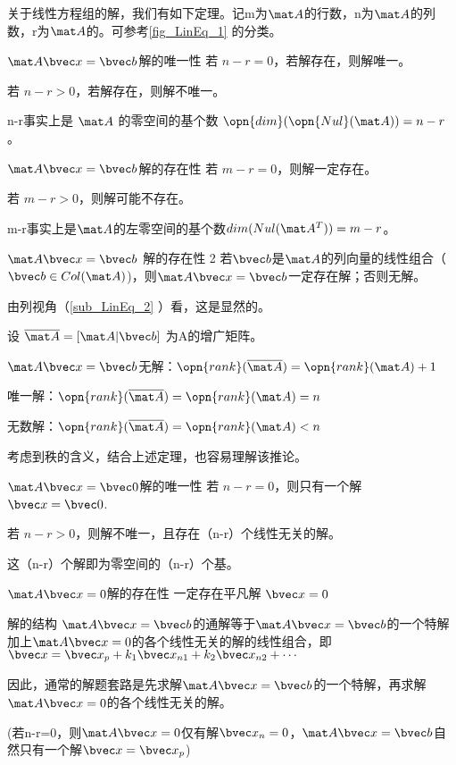 

关于线性方程组的解，我们有如下定理。记m为$\mat A$的行数，n为$\mat A$的列数，r为$\mat A$的。可参考\autoref{fig_LinEq_1} 的分类。

\begin{theorem}{$\mat A \bvec x=\bvec b$解的唯一性}
若 $n-r=0$，若解存在，则解唯一。

若 $n-r>0$，若解存在，则解不唯一。
\end{theorem}
n-r事实上是 $\mat A$ 的零空间的基个数 $\opn{dim}(\opn{Nul}(\mat A))=n-r$。

\begin{theorem}{$\mat A \bvec x=\bvec b$解的存在性}
若 $m-r=0$，则解一定存在。

若 $m-r>0$，则解可能不存在。
\end{theorem}
m-r事实上是$\mat A$的左零空间的基个数$dim(Nul(\mat A^T))=m-r$。

\begin{theorem}{$\mat A \bvec x=\bvec b$ 解的存在性 2}
若$\bvec b$是$\mat A$的列向量的线性组合（$\bvec b \in Col(\mat A)$)，则$\mat A \bvec x=\bvec b$一定存在解；否则无解。
\end{theorem}
由列视角（\autoref{sub_LinEq_2} ）看，这是显然的。

\begin{corollary}{}
设 $\overline{\mat A} = [\mat A | \bvec b] $ 为A的增广矩阵。

$\mat A \bvec x=\bvec b$无解：$\opn{rank}(\overline{\mat A})=\opn{rank}(\mat A)+1$

唯一解：$\opn{rank}(\overline{\mat A})=\opn{rank}(\mat A)=n$

无数解：$\opn{rank}(\overline{\mat A})=\opn{rank}(\mat A)<n$
\end{corollary}
考虑到秩的含义，结合上述定理，也容易理解该推论。

\begin{theorem}{$\mat A \bvec x=\bvec 0$解的唯一性}
若 $n-r=0$，则只有一个解 $\bvec x = \bvec 0$.

若 $n-r>0$，则解不唯一，且存在（n-r）个线性无关的解。
\end{theorem}
这（n-r）个解即为零空间的（n-r）个基。

\begin{theorem}{$\mat A \bvec x=0$解的存在性}
一定存在平凡解 $\bvec x=0$
\end{theorem}

\begin{theorem}{解的结构}
$\mat A \bvec x=\bvec b$的通解等于$\mat A \bvec x=\bvec b$的一个特解加上$\mat A \bvec x=0$的各个线性无关的解的线性组合，即$\bvec x = \bvec x_p +k_1\bvec x_{n1}+k_2\bvec x_{n2}+\cdots$

因此，通常的解题套路是先求解$\mat A \bvec x=\bvec b$的一个特解，再求解$\mat A \bvec x=0$的各个线性无关的解。

(若n-r=0，则$\mat A \bvec x=0$仅有解$\bvec x_n=0$，$\mat A \bvec x=\bvec b$自然只有一个解$\bvec x = \bvec x_p$)
\end{theorem}

